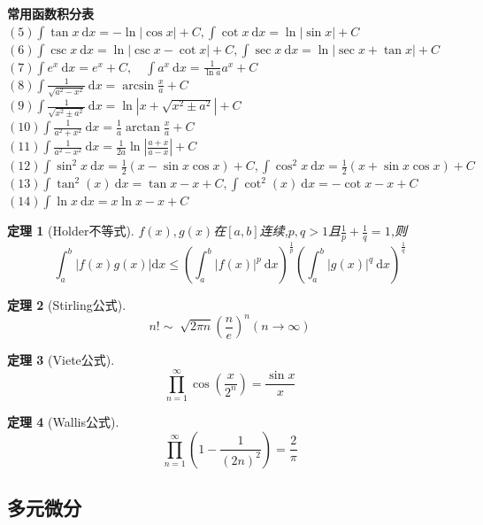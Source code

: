 \documentclass[UTF8]{ctexart}
\newtheorem{thm}{定理}[section]
\begin{document}
\noindent \textbf{常用函数积分表}\\
$(5)  \int\tan x \mathrm{~d} x=-\ln |\cos x|+C,\int\cot x \mathrm{~d} x=\ln |\sin x|+C $\\
$(6)  \int\csc x\mathrm{~d}x=\ln|\csc x-\cot x|+C,\int\sec x \mathrm{~d} x=\ln |\sec x+\tan x|+C $\\
$(7)  \int e^{x} \mathrm{~d} x=e^{x}+C, \quad \int a^{x} \mathrm{~d} x=\frac{1}{\ln a} a^{x}+C $\\
$(8)  \int \frac{1}{\sqrt{a^2-x^{2}}} \mathrm{~d} x=\arcsin\frac{x}{a}+C $\\
$(9)  \int \frac{1}{\sqrt{x^{2}\pm a^{2}}} \mathrm{~d} x=\ln \left|x+\sqrt{x^{2}\pm a^{2}}\right|+C$\\
$(10) \int \frac{1}{a^2+x^{2}} \mathrm{~d} x=\frac{1}{a}\arctan\frac{x}{a}+C $\\
$(11) \int \frac{1}{a^2-x^2}\mathrm{~d}x=\frac{1}{2a}\ln|\frac{a+x}{a-x}|+C $\\
$(12) \int \sin ^{2} x \mathrm{~d} x=\frac{1}{2}(x-\sin x \cos x)+C ,\int \cos ^{2} x \mathrm{~d} x=\frac{1}{2}(x+\sin x \cos x)+C$\\
$(13) \int \tan^2(x)\mathrm{~d} x=\tan x-x+C,\int\cot^2(x)\mathrm{~d} x=-\cot x-x+C$ \\
$(14) \int \ln x \mathrm{~d} x= x \ln x -x +C$


\begin{thm}[Holder不等式]
	$f(x),g(x)$在$[a,b]$连续,$p,q>1$且$\frac{1}{p}+\frac{1}{q}=1$,则
	$$\int_{a}^{b}|f(x)g(x)|\mathrm{d}x\leq
	\left(\int_{a}^{b}|f(x)|^{p} \mathrm{~d} x\right)^{\frac{1}{p}}
	\left(\int_{a}^{b}|g(x)|^{q} \mathrm{~d} x\right)^{\frac{1}{q}}$$
\end{thm}

\begin{thm}[Stirling公式]
	$$n!\sim \sqrt[]{2\pi n}\left(\frac{n}{e}\right)^n (n\to\infty )$$
\end{thm}

\begin{thm}[Viete公式]
	$$\prod_{n=1}^{\infty} \cos (\frac{x}{2^n})=\frac{\sin x}{x} $$
\end{thm}

\begin{thm}[Wallis公式]
	$$\prod_{n=1}^{\infty} (1-\frac{1}{(2n)^2})=\frac{2}{\pi } $$
\end{thm}

\subsection{多元微分}
\end{document}
